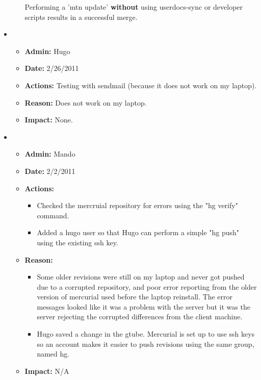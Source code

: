 \documentclass[12pt]{article}
\begin{document}
\begin{itemize}
\begin{itemize}
  Performing a 'mtn update' {\bf without} using userdocs-sync or developer scripts results in a successful merge. 
  
  
  \end{itemize}


\item
  \begin{itemize}
  \item[] {\bf Admin:} Hugo
  \item[] {\bf Date:} 2/26/2011 
  \item[] {\bf Actions:} Testing with sendmail (because it does not work on my laptop).
  \item[] {\bf Reason:} Does not work on my laptop.
  \item[] {\bf Impact:} None.
  \end{itemize}

\item
\begin{itemize}
\item[] {\bf Admin:} Mando
\item[] {\bf Date:} 2/2/2011 
\item[] {\bf Actions:}  

  \begin{itemize}
  \item[] Checked the mercruial repository for errors using the "hg verify" command. 
  \item[] Added a hugo user so that Hugo can perform a simple "hg push" using the existing ssh key.
  \end{itemize}

\item[] {\bf Reason:} 

  \begin{itemize}
  \item[] Some older revisions were still on my laptop and never got pushed due to a corrupted repository, and poor error reporting from the older version of mercurial used before the laptop reinstall. The error messages looked like it was a problem with the server but it was the server rejecting the corrupted differences from the client machine. 
  \item[] Hugo saved a change in the gtube. Mercurial is set up to use ssh keys so an account makes it easier to push revisions using the same group, named hg.
  \end{itemize}

\item[] {\bf Impact:}  N/A
\end{itemize}


\end{itemize}
\end{document}
